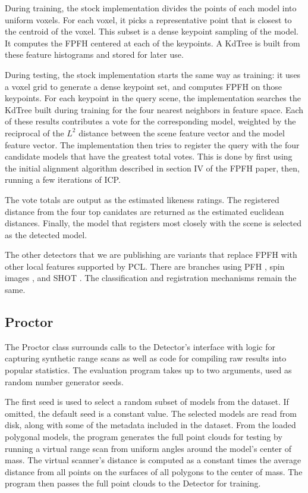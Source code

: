 During training, the stock implementation divides the points of each model into uniform voxels. For each voxel, it picks a representative point that is closest to the centroid of the voxel. This subset is a dense keypoint sampling of the model. It computes the FPFH centered at each of the keypoints. A KdTree is built from these feature histograms and stored for later use.

During testing, the stock implementation starts the same way as training: it uses a voxel grid to generate a dense keypoint set, and computes FPFH on those keypoints.
For each keypoint in the query scene, the implementation searches the KdTree built during training for the four nearest neighbors in feature space. Each of these results contributes a vote for the corresponding model, weighted by the reciprocal of the $L^2$ distance between the scene feature vector and the model feature vector.
The implementation then tries to register the query with the four candidate models that have the greatest total votes.
This is done by first using the initial alignment algorithm described in section IV of the FPFH paper, then, running a few iterations of ICP.

The vote totals are output as the estimated likeness ratings.
The registered distance from the four top canidates are returned as the estimated euclidean distances.
Finally, the model that registers most closely with the scene is selected as the detected model.

The other detectors that we are publishing are variants that replace FPFH with other local features supported by PCL. There are branches using PFH \cite{pfh1, pfh2}, spin images \cite{spin}, and SHOT \cite{shot}.
The classification and registration mechanisms remain the same.

\subsection{Proctor}
The Proctor class surrounds calls to the Detector's interface with logic for capturing synthetic range scans as well as code for compiling raw results into popular statistics.
The evaluation program takes up to two arguments, used as random number generator seeds.

The first seed is used to select a random subset of models from the dataset. If omitted, the default seed is a constant value.
The selected models are read from disk, along with some of the metadata included in the dataset.
From the loaded polygonal models, the program generates the full point clouds for testing by running a virtual range scan from uniform angles around the model's center of mass.
The virtual scanner's distance is computed as a constant times the average distance from all points on the surfaces of all polygons to the center of mass.
The program then passes the full point clouds to the Detector for training.

